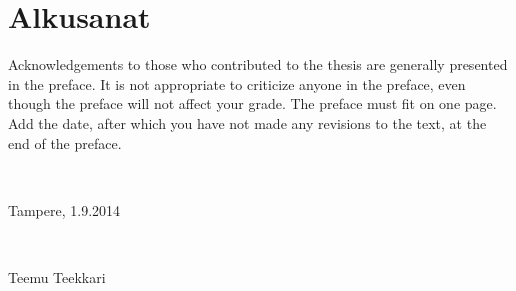 \documentclass[12pt,a4paper,finnish]{tutthesis}
\begin{document}
\chapter*{Alkusanat}

Acknowledgements to those who contributed to the thesis are generally
presented in the preface. It is not appropriate to criticize anyone in
the preface, even though the preface will not affect your grade. The
preface must fit on one page. Add the date, after which you have not
made any revisions to the text, at the end of the preface.

~ 

Tampere, 1.9.2014

~


Teemu Teekkari



%
%

\renewcommand\contentsname{Sisällys}         %
\setcounter{tocdepth}{3}                      %
\tableofcontents                              %

\renewcommand\listfigurename{Kuvaluettelo}    %
\listoffigures                                 %
\markboth{}{}                                  %

\renewcommand\listtablename{Taulukkoluettelo} %
\listoftables                                  %
\markboth{}{}                                  %
\end{document}
